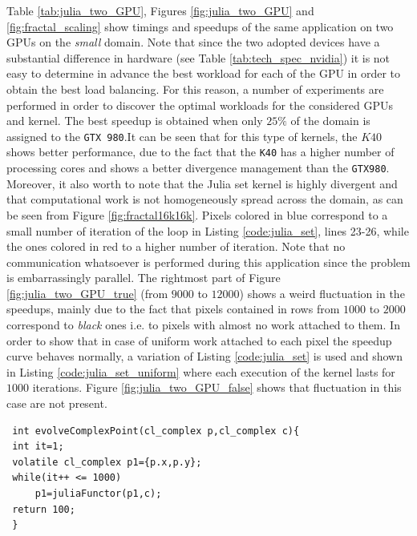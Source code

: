 Table \ref{tab:julia_two_GPU}, Figures \ref{fig:julia_two_GPU} and \ref{fig:fractal_scaling} show timings and speedups of the same application on two GPUs on the \textit{small} domain. Note that since the two adopted devices  have a substantial difference in hardware (see Table \ref{tab:tech_spec_nvidia}) it is not easy to determine in advance the best workload for each of the GPU in order to obtain the best load balancing. For this reason, a number of experiments are performed in order to discover the optimal workloads for the considered GPUs and kernel.
The best speedup is obtained when only $25\%$ of the domain is assigned to the \texttt{GTX 980}.It can be seen that for this type of kernels, the $K40$ shows better performance, due to the fact that the \texttt{K40} has a higher number of processing cores and shows a better divergence management than the \texttt{GTX980}.
Moreover, it also worth to note that the Julia set kernel is highly divergent and that computational work is not homogeneously spread across the domain, as can be seen from Figure \ref{fig:fractal16k16k}. Pixels colored in blue correspond to a small number of iteration of the loop in Listing \ref{code:julia_set}, lines 23-26, while the ones colored in red to a higher number of iteration.
Note that no communication whatsoever is performed during this application since the problem is embarrassingly parallel.
The rightmost part of Figure \ref{fig:julia_two_GPU_true} (from $9000$ to $12000$) shows a weird fluctuation in the speedups, mainly due to the fact that pixels contained in rows from $1000$ to $2000$ correspond to \textit{black} ones i.e. to pixels with almost no work attached to them.
In order to show that in case of uniform work attached to each pixel the speedup curve behaves normally, a variation of Listing \ref{code:julia_set} is used and shown in Listing \ref{code:julia_set_uniform} where each execution of the kernel lasts for $1000$ iterations.
Figure \ref{fig:julia_two_GPU_false} shows that fluctuation in this case are not present.
\begin{minipage}{\linewidth}
 \begin{lstlisting}
 int evolveComplexPoint(cl_complex p,cl_complex c){
 int it=1;
 volatile cl_complex p1={p.x,p.y};
 while(it++ <= 1000)
     p1=juliaFunctor(p1,c);
 return 100;
 }
 \end{lstlisting}
\end{minipage}
 
